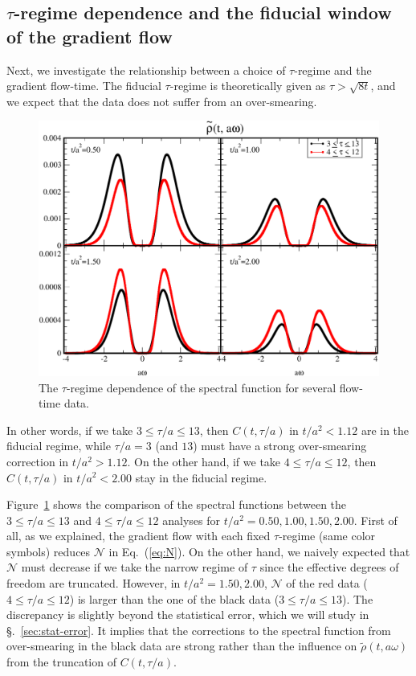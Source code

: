 \documentclass[a4paper,11pt]{article}
\begin{document}
\subsection{$\tau$-regime dependence and the fiducial window of the gradient flow}\label{sec:tau-deps}
Next, we investigate the relationship between a choice of $\tau$-regime and the gradient flow-time. 
The fiducial $\tau$-regime is theoretically given as $\tau > \sqrt{8t}$, and we expect that  the data does not suffer from an over-smearing.
\begin{figure}[h]
\begin{center}
\includegraphics[scale=0.45]{./rho-center-Ntaudata-deps.pdf}
\caption{The $\tau$-regime dependence of the spectral function for several flow-time data.   }
\label{fig:rho-Ntaudata-deps}
\end{center}
\end{figure}
In other words, if we take $3 \le \tau/a \le 13$, then $C(t,\tau/a)$ in $t/a^2 < 1.12$ are in the fiducial regime, while $\tau/a=3$ (and $13$) must have a strong over-smearing correction in $t/a^2 > 1.12$.
On the other hand, if we take $4 \le \tau/a \le 12$, then $C(t,\tau/a)$ in $t/a^2 < 2.00$ stay in the fiducial regime.

Figure~\ref{fig:rho-Ntaudata-deps} shows the comparison of the spectral functions between the $3 \le \tau/a \le 13$ and $4 \le \tau/a \le 12$ analyses for $t/a^2 =0.50, 1.00, 1.50, 2.00$.
First of all, as we explained, the gradient flow with each fixed $\tau$-regime (same color symbols) reduces $\mathcal{N}$ in Eq.~(\ref{eq:N}).
On the other hand, we naively expected that $\mathcal{N}$ must decrease if we take the narrow regime of $\tau$ since the effective degrees of freedom are truncated.
However, in $t/a^2=1.50, 2.00$, $\mathcal{N}$ of the red data ($4\le \tau/a \le 12$) is larger than the one of the black data ($3 \le \tau/a \le 13$).
The discrepancy is slightly beyond the statistical error, which we will study in \S.~\ref{sec:stat-error}.
It implies that the corrections to the spectral function from over-smearing in the black data are strong rather than the influence on $\tilde{\rho}(t,a\omega)$ from the truncation of $C(t,\tau/a)$.
\end{document}
